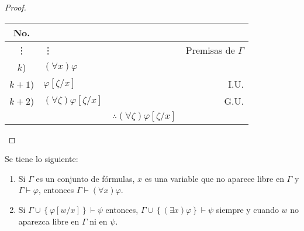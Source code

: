 \documentclass[12pt]{report}
\theoremstyle{largebreak}
\begin{document}
    \begin{proof}
        \begin{center}
            \begin{tabular}{ c  l  l  r  }
                \hline
                No. &  &  &  \\
                \hline
                \vdots & \vdots  &  & Premisas de $\Gamma$  \\
                $k$) & $(\forall x)\varphi$ &  &  \\
                $k+1$) & $\varphi[\zeta/x]$ &  & I.U. \\
                $k+2$) & $(\forall\zeta)\varphi[\zeta/x]$ &  & G.U. \\
                \hline
                  &  &  $\therefore(\forall\zeta)\varphi[\zeta/x]$ &  \\
            \end{tabular}
        \end{center}
    \end{proof}

    \begin{theor}[Metateorema]
        Se tiene lo siguiente:
        \begin{enumerate}
            \item Si $\Gamma$ es un conjunto de fórmulas, $x$ es una variable que no aparece libre en $\Gamma$ y $\Gamma\vdash\varphi$, entonces $\Gamma\vdash(\forall x)\varphi$.
            \item Si $\Gamma\cup\left\{\varphi[w/x] \right\}\vdash\psi$ entonces, $\Gamma\cup\left\{(\exists x)\varphi \right\}\vdash\psi$ siempre y cuando $w$ no aparezca libre en $\Gamma$ ni en $\psi$.
        \end{enumerate}        
    \end{theor}
\end{document}
